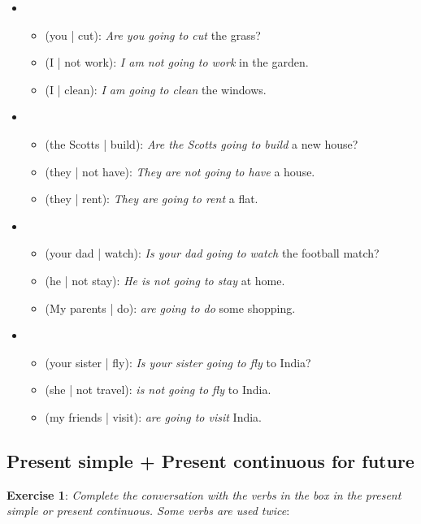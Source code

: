 \begin{itemize}

\item
\begin{itemize}
\item (you | cut): \textit{Are you going to cut} the grass?
\item (I | not work): \textit{I am not going to work} in the garden.
\item (I | clean): \textit{I am going to clean} the windows.
\end{itemize}

\item
\begin{itemize}
\item (the Scotts | build): \textit{Are the Scotts going to build} a new house?
\item (they | not have): \textit{They are not going to have} a house.
\item (they | rent): \textit{They are going to rent} a flat.
\end{itemize}

\item
\begin{itemize}
\item (your dad | watch): \textit{Is your dad going to watch} the football match?
\item (he | not stay): \textit{He is not going to stay} at home.
\item (My parents | do): \textit{are going to do} some shopping.
\end{itemize}

\item
\begin{itemize}
\item (your sister | fly): \textit{Is your sister going to fly} to India?
\item (she | not travel): \textit{is not going to fly} to India.
\item (my friends | visit): \textit{are going to visit} India.
\end{itemize}

\end{itemize}

\subsection{Present simple + Present continuous for future}

\textbf{Exercise 1}: \textit{Complete the conversation with the verbs in the box in the present simple or present continuous. Some verbs are used twice}:

